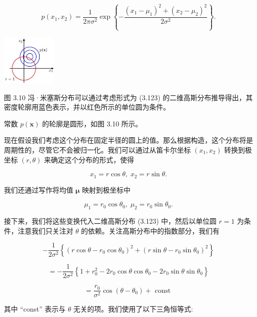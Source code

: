 \documentclass[10pt]{report}
\begin{document}
\[
p\left( {{x}_{1},{x}_{2}}\right)  = \frac{1}{{2\pi }{\sigma }^{2}}\exp \left\{  {-\frac{{\left( {x}_{1} - {\mu }_{1}\right) }^{2} + {\left( {x}_{2} - {\mu }_{2}\right) }^{2}}{2{\sigma }^{2}}}\right\}  . \tag{3.123}
\]

\begin{center}
\includegraphics[max width=0.2\textwidth]{images/0194e279-9b28-703a-88f4-c3ac21e2010d_110_1177_344_365_339_0.jpg}
\end{center}
\hspace*{3em} 

图 3.10 冯·米塞斯分布可以通过考虑形式为 (3.123) 的二维高斯分布推导得出，其密度轮廓用蓝色表示，并以红色所示的单位圆为条件。

常数 \(p\left( \mathbf{x}\right)\) 的轮廓是圆形，如图 3.10 所示。

现在假设我们考虑这个分布在固定半径的圆上的值。那么根据构造，这个分布将是周期性的，尽管它不会被归一化。我们可以通过从笛卡尔坐标 \(\left( {{x}_{1},{x}_{2}}\right)\) 转换到极坐标 \(\left( {r,\theta }\right)\) 来确定这个分布的形式，使得

\[
{x}_{1} = r\cos \theta ,\;{x}_{2} = r\sin \theta . \tag{3.124}
\]

我们还通过写作将均值 \(\mathbf{\mu }\) 映射到极坐标中

\[
{\mu }_{1} = {r}_{0}\cos {\theta }_{0},\;{\mu }_{2} = {r}_{0}\sin {\theta }_{0}. \tag{3.125}
\]

接下来，我们将这些变换代入二维高斯分布 (3.123) 中，然后以单位圆 \(r = 1\) 为条件，注意我们只关注对 \(\theta\) 的依赖。关注高斯分布中的指数部分，我们有

\[
- \frac{1}{2{\sigma }^{2}}\left\{  {{\left( r\cos \theta  - {r}_{0}\cos {\theta }_{0}\right) }^{2} + {\left( r\sin \theta  - {r}_{0}\sin {\theta }_{0}\right) }^{2}}\right\}
\]

\[
=  - \frac{1}{2{\sigma }^{2}}\left\{  {1 + {r}_{0}^{2} - 2{r}_{0}\cos \theta \cos {\theta }_{0} - 2{r}_{0}\sin \theta \sin {\theta }_{0}}\right\}
\]

\[
= \frac{{r}_{0}}{{\sigma }^{2}}\cos \left( {\theta  - {\theta }_{0}}\right)  + \text{ const } \tag{3.126}
\]

其中 “const” 表示与 \(\theta\) 无关的项。我们使用了以下三角恒等式:
\end{document}
